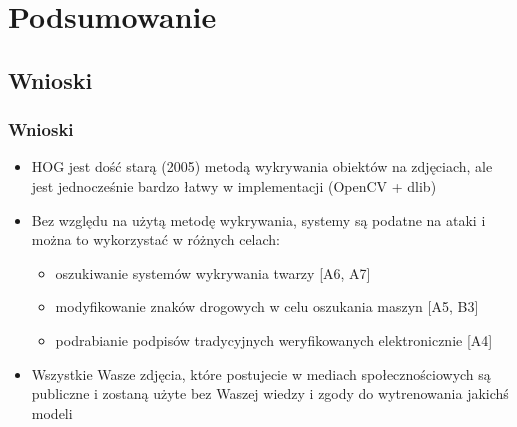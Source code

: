 \documentclass{beamer}
\begin{document}
    \section{Podsumowanie}
        \subsection{Wnioski}
            \begin{frame}
                \frametitle{Wnioski}
                \begin{itemize}
                    \item HOG jest dość starą (2005) metodą wykrywania obiektów na zdjęciach, ale jest jednocześnie bardzo łatwy w implementacji (OpenCV + dlib)
                    \item Bez względu na użytą metodę wykrywania, systemy są podatne na ataki i można to wykorzystać w różnych celach:
                        \begin{itemize}
                            \item oszukiwanie systemów wykrywania twarzy [A6, A7]
                            \item modyfikowanie znaków drogowych w celu oszukania maszyn [A5, B3]
                            \item podrabianie podpisów tradycyjnych weryfikowanych elektronicznie [A4]
                        \end{itemize}
                    \item Wszystkie Wasze zdjęcia, które postujecie w mediach społecznościowych są publiczne i zostaną użyte bez Waszej wiedzy i zgody do wytrenowania jakichś modeli
                \end{itemize}
            \end{frame}
\end{document}
